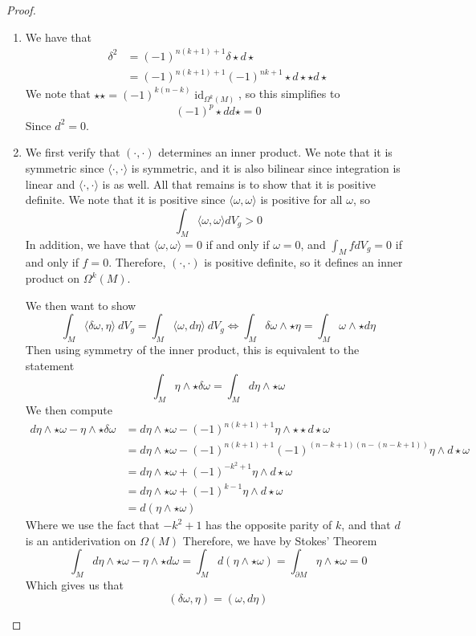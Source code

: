 \documentclass[psamsfonts]{amsart}
\theoremstyle{definition}
\theoremstyle{remark}
\DeclareMathOperator{\id}{id}
\begin{document}
\begin{proof}
\begin{enumerate}
\item We have that
\begin{align*}
\delta^2 &= (-1)^{n(k+1)+1} \delta \star d \star \\
&= (-1)^{n(k+1) + 1}(-1)^{nk + 1} \star d \star \star d \star
\end{align*}
We note that $\star\star = (-1)^{k(n-k)}\id_{\Omega^k(M)}$, so this simplifies to
$$(-1)^p \star d d \star = 0 $$
Since $d^2 = 0$.
\item We first verify that $(\cdot, \cdot)$ determines  an inner product. We note that it is symmetric since $\langle  \cdot, \cdot \rangle$ is symmetric, and it is also bilinear since integration is linear and $\langle \cdot, \cdot \rangle$ is as well. All that remains is to show that it is positive definite. We note that it is positive since $\langle \omega, \omega \rangle$ is positive for all $\omega$, so 
$$\int_M \langle\omega,\omega\rangle dV_g > 0$$
In addition, we have that $\langle \omega, \omega \rangle = 0$ if and only if $\omega = 0$, and $\int_M fdV_g = 0$ if and only  if $f = 0$. Therefore, $(\cdot,\cdot)$ is positive definite, so it defines an inner product on $\Omega^k(M)$.

We then want to show
$$\int_M \langle \delta\omega,\eta \rangle~dV_g = \int_M \langle\omega,d\eta\rangle~dV_g \iff\int_M  \delta\omega \wedge \star\eta = \int_M \omega \wedge \star d\eta $$
Then using symmetry of the inner product, this is equivalent to the statement
$$\int_M \eta \wedge \star\delta\omega = \int_M d\eta \wedge \star\omega $$
We then compute
\begin{align*}
d\eta \wedge \star\omega - \eta \wedge \star\delta\omega &= d\eta \wedge\star\omega - (-1)^{n(k+1)+1}\eta \wedge \star\star d\star\omega \\
&= d\eta \wedge \star\omega - (-1)^{n(k+1)+1}(-1)^{(n-k+1)(n-(n-k+1))}\eta \wedge d\star\omega \\
&= d\eta \wedge \star\omega + (-1)^{-k^2 + 1}  \eta \wedge d\star\omega \\
&= d\eta \wedge  \star\omega + (-1)^{k-1}\eta\wedge d\star\omega \\
&= d(\eta \wedge \star\omega)
\end{align*}
Where we use the fact that $-k^2  + 1$ has the opposite parity of $k$, and that $d$ is an antiderivation on $\Omega(M)$
Therefore, we have by Stokes' Theorem
$$\int_M d\eta \wedge \star\omega - \eta \wedge \star d\omega = \int_M d(\eta \wedge\star\omega) = \int_{\partial M} \eta \wedge  \star\omega = 0 $$
Which gives us that 
$$ (\delta\omega, \eta)= (\omega,d\eta)$$
\end{enumerate}
\end{proof}
\end{document}
